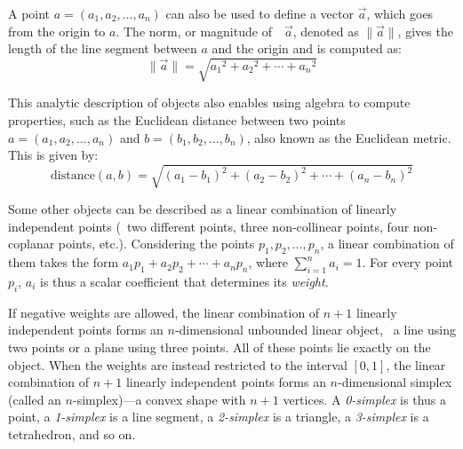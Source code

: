 A point $a = (a_1, a_2, \ldots, a_n)$ can also be used to define a vector $\vec{a}$, which goes from the origin to $a$.
The norm, or magnitude of\ \ $\vec{a}$, denoted as $\| \vec{a} \|$, gives the length of the line segment between $a$ and the origin and is computed as:
\begin{equation*}
\| \vec{a} \| = \sqrt{{a_1}^{2} + {a_2}^{2} + \cdots + {a_n}^{2}}
\end{equation*}

This analytic description of objects also enables using algebra to compute properties, such as the Euclidean distance between two points $a = (a_1, a_2, \ldots, a_n)$ and $b = (b_1, b_2, \ldots, b_n)$, also known as the Euclidean metric.
This is given by:
\begin{equation*}
\mathrm{distance}(a,b) = \sqrt{{(a_1 - b_1)}^{2} + {(a_2 - b_2)}^{2} + \cdots + {(a_n - b_n)}^{2}}
\end{equation*}

Some other objects can be described as a linear combination of linearly independent points (\ie\ two different points, three non-collinear points, four non-coplanar points, etc.).
Considering the points $p_1,p_2,\ldots,p_n$, a linear combination of them takes the form $a_1 p_1 + a_2 p_2 + \cdots + a_n p_n$, where $\sum_{i=1}^n a_i = 1$.
For every point $p_i$, $a_i$ is thus a scalar coefficient that determines its \emph{weight}.

If negative weights are allowed, the linear combination of $n+1$ linearly independent points forms an $n$-dimensional unbounded linear object, \eg\ a line using two points or a plane using three points.
All of these points lie exactly on the object.
When the weights are instead restricted to the interval $[0,1]$, the linear combination of $n+1$ linearly independent points forms an $n$-dimensional simplex (called an $n$-simplex)---a convex shape with $n+1$ vertices.
A \emph{0-simplex} is thus a point, a \emph{1-simplex} is a line segment, a \emph{2-simplex} is a triangle, a \emph{3-simplex} is a tetrahedron, and so on.

